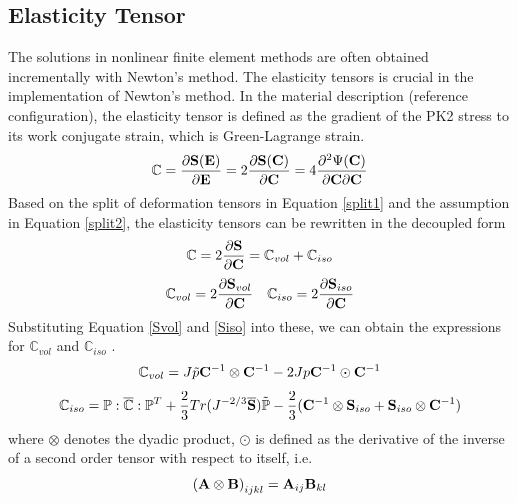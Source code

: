\subsection{Elasticity Tensor}
The solutions in nonlinear finite element methods are often obtained incrementally with Newton's method. The elasticity tensors is crucial in the implementation of Newton's method.
In the material description (reference configuration), the elasticity tensor is defined as the gradient of the PK2 stress to its work conjugate strain, which is Green-Lagrange strain.
\begin{equation}
\mathbb{C} = \frac{\partial{\bold{S}(\bold{E})}}{\partial{\bold{E}}} =  2\frac{\partial{\bold{S}(\bold{C})}} {\partial{\bold{C}}} = 4 \frac{\partial^2{\Psi(\bold{C})}}{{\partial{\bold{C}}}{\partial{\bold{C}}}}
\end{equation}
Based on the split of deformation tensors in Equation \ref{split1} and the assumption in Equation \ref{split2}, the elasticity tensors can be rewritten in the decoupled form
\begin{equation} \label{C}
\mathbb{C} = 2\frac{\partial{\bold{S}}}{\partial{\bold{C}}} = \mathbb{C}_{vol} + \mathbb{C}_{iso} 
\end{equation}
\begin{equation} \label{Cvol}
\mathbb{C}_{vol} = 2\frac{\partial{\bold{S}_{vol}}}{\partial{\bold{C}}}
\quad
\mathbb{C}_{iso} = 2\frac{\partial{\bold{S}_{iso}}}{\partial{\bold{C}}}
\end{equation}
Substituting Equation \ref{Svol} and \ref{Siso}  into these, we can obtain the expressions for $\mathbb{C}_{vol}$ and $\mathbb{C}_{iso}$ .
\begin{equation} \label{Cvol}
\mathbb{C}_{vol} = J\tilde{p}\bold{C}^{-1}\otimes\bold{C}^{-1} - 2Jp\bold{C}^{-1}\odot\bold{C}^{-1}
\end{equation}
\begin{equation} \label{Ciso}
\mathbb{C}_{iso} = \mathbb{P} : \overline{\mathbb{C}} : \mathbb{P}^T + \frac{2}{3}Tr(J^{-2/3}\overline{\bold{S}})\tilde{\mathbb{P}} - \frac{2}{3}(\bold{C}^{-1}\otimes\bold{S}_{iso} + \bold{S}_{iso}\otimes \bold{C}^{-1})
\end{equation}
where $\otimes$ denotes the dyadic product, $\odot$ is defined as the derivative of the inverse of a second order tensor with respect to itself, i.e.
\begin{equation}\label{dyadic}
{(\bold{A} \otimes \bold{B})}_{ijkl} = {\bold{A}}_{ij}{\bold{B}}_{kl}
\end{equation}
